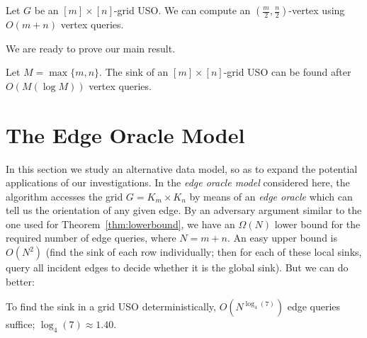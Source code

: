 \documentclass[runningheads,a4paper]{llncs}
\begin{document}
\begin{corollary}\label{corollary: (m/2,n/2) indegree}
Let $G$ be an $[m]\times [n]$-grid USO. 
We can compute an $( \frac{m}{2}, \frac{n}{2})$-vertex using $O(m + n)$ vertex queries.
\end{corollary}

We are ready to prove our main result. 

\begin{theorem}\label{theorem:Sink algorithm}
 Let $M = \max\{m,n\}$. The sink of an $[m]\times[n]$-grid USO can be found after $O(M(\log M))$ vertex queries.
\end{theorem}

\section{The Edge Oracle Model}
\label{section:The edge oracle model}

In this section we study an alternative data model, so as to expand the
potential applications of our investigations.
In the \emph{edge oracle model} considered here, the algorithm accesses the
grid $G = K_m \times K_n$ by means of an \emph{edge oracle} which can tell us
the orientation of any given edge.
By an adversary argument similar to the one used for Theorem~\ref{thm:lowerbound},
we have an $\Omega(N)$ lower bound for the required number of edge queries,
where $N = m+n$.
An easy upper bound is $O(N^2)$ (find the sink of each row individually; then
for each of these local sinks, query all incident edges to decide whether it
is the global sink).
But we can do better:

\begin{theorem}
    \label{thm:timeEdge}
    To find the sink in a grid USO deterministically,
    $O(N ^ {\log_4(7)})$ edge queries suffice; $\log_4(7) \approx
    1.40$.
\end{theorem}
\end{document}
